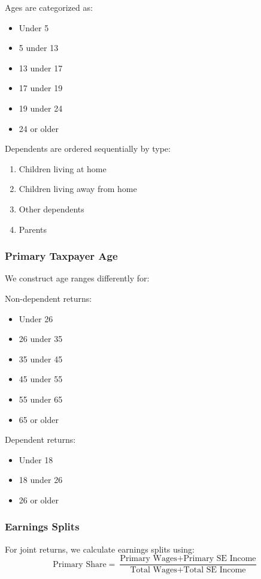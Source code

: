 Ages are categorized as:
\begin{itemize}
    \item Under 5
    \item 5 under 13
    \item 13 under 17
    \item 17 under 19
    \item 19 under 24
    \item 24 or older
\end{itemize}

Dependents are ordered sequentially by type:
\begin{enumerate}
    \item Children living at home
    \item Children living away from home
    \item Other dependents
    \item Parents
\end{enumerate}

\subsubsection{Primary Taxpayer Age}
We construct age ranges differently for:

Non-dependent returns:
\begin{itemize}
    \item Under 26
    \item 26 under 35
    \item 35 under 45
    \item 45 under 55
    \item 55 under 65
    \item 65 or older
\end{itemize}

Dependent returns:
\begin{itemize}
    \item Under 18
    \item 18 under 26
    \item 26 or older
\end{itemize}

\subsubsection{Earnings Splits}
For joint returns, we calculate earnings splits using:
\[ \text{Primary Share} = \frac{\text{Primary Wages} + \text{Primary SE Income}}{\text{Total Wages} + \text{Total SE Income}} \]

